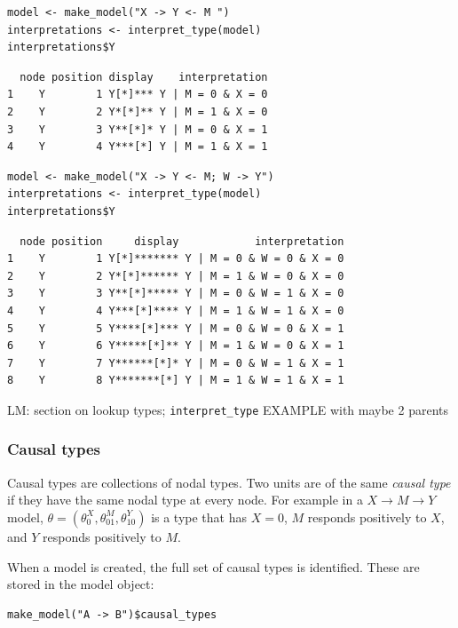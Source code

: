 \documentclass[
  article]{jss}
\begin{document}
\begin{verbatim}
model <- make_model("X -> Y <- M ")
interpretations <- interpret_type(model)
interpretations$Y
\end{verbatim}

\begin{verbatim}
  node position display    interpretation
1    Y        1 Y[*]*** Y | M = 0 & X = 0
2    Y        2 Y*[*]** Y | M = 1 & X = 0
3    Y        3 Y**[*]* Y | M = 0 & X = 1
4    Y        4 Y***[*] Y | M = 1 & X = 1
\end{verbatim}

\begin{verbatim}
model <- make_model("X -> Y <- M; W -> Y")
interpretations <- interpret_type(model)
interpretations$Y
\end{verbatim}

\begin{verbatim}
  node position     display            interpretation
1    Y        1 Y[*]******* Y | M = 0 & W = 0 & X = 0
2    Y        2 Y*[*]****** Y | M = 1 & W = 0 & X = 0
3    Y        3 Y**[*]***** Y | M = 0 & W = 1 & X = 0
4    Y        4 Y***[*]**** Y | M = 1 & W = 1 & X = 0
5    Y        5 Y****[*]*** Y | M = 0 & W = 0 & X = 1
6    Y        6 Y*****[*]** Y | M = 1 & W = 0 & X = 1
7    Y        7 Y******[*]* Y | M = 0 & W = 1 & X = 1
8    Y        8 Y*******[*] Y | M = 1 & W = 1 & X = 1
\end{verbatim}

LM: section on lookup types; \texttt{interpret\_type} EXAMPLE with maybe
2 parents

\hypertarget{causal-types}{%
\subsubsection{Causal types}\label{causal-types}}

Causal types are collections of nodal types. Two units are of the same
\emph{causal type} if they have the same nodal type at every node. For
example in a \(X \rightarrow M \rightarrow Y\) model,
\(\theta = (\theta^X_0, \theta^M_{01}, \theta^Y_{10})\) is a type that
has \(X=0\), \(M\) responds positively to \(X\), and \(Y\) responds
positively to \(M\).

When a model is created, the full set of causal types is identified.
These are stored in the model object:

\begin{verbatim}
make_model("A -> B")$causal_types
\end{verbatim}
\end{document}
